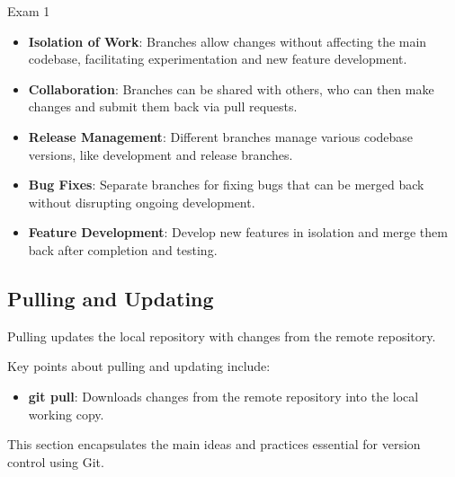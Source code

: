 \begin{examnotes}{Exam 1}
\begin{highlight}
        \begin{itemize}
            \item \textbf{Isolation of Work}: Branches allow changes without affecting the main codebase, facilitating experimentation and new feature development.
            \item \textbf{Collaboration}: Branches can be shared with others, who can then make changes and submit them back via pull requests.
            \item \textbf{Release Management}: Different branches manage various codebase versions, like development and release branches.
            \item \textbf{Bug Fixes}: Separate branches for fixing bugs that can be merged back without disrupting ongoing development.
            \item \textbf{Feature Development}: Develop new features in isolation and merge them back after completion and testing.
        \end{itemize}
    \end{highlight}
    
    \subsection*{Pulling and Updating}
    
    Pulling updates the local repository with changes from the remote repository.
    
    \begin{highlight}
        Key points about pulling and updating include:
        
        \begin{itemize}
            \item \textbf{git pull}: Downloads changes from the remote repository into the local working copy.
        \end{itemize}
    \end{highlight}
    
    \begin{highlight}
        This section encapsulates the main ideas and practices essential for version control using Git.
        

\end{highlight}
\end{examnotes}

